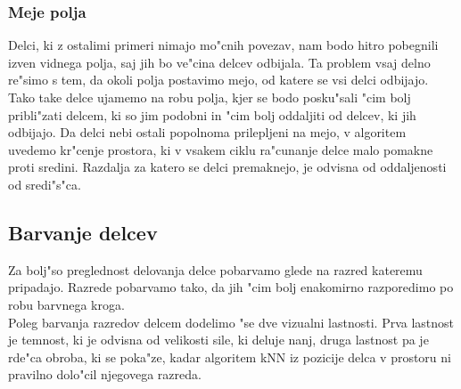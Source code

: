 \documentclass[a4paper]{article}
\begin{document}
		\subsubsection{Meje polja}
			Delci, ki z ostalimi primeri nimajo mo"cnih povezav, nam bodo hitro pobegnili izven vidnega polja, saj jih bo ve"cina delcev odbijala. Ta problem vsaj delno re"simo s tem, da okoli polja postavimo mejo, od katere se vsi delci odbijajo. Tako take delce ujamemo na robu polja, kjer se bodo posku"sali "cim bolj pribli"zati delcem, ki so jim podobni in "cim bolj oddaljiti od delcev, ki jih odbijajo. Da delci nebi ostali popolnoma prilepljeni na mejo, v algoritem uvedemo kr"cenje prostora, ki v vsakem ciklu ra"cunanje delce malo pomakne proti sredini. Razdalja za katero se delci premaknejo, je odvisna od oddaljenosti od sredi"s"ca.
	
	\subsection{Barvanje delcev}
		Za bolj"so preglednost delovanja delce pobarvamo glede na razred kateremu pripadajo. Razrede pobarvamo tako, da jih "cim bolj enakomirno razporedimo po robu barvnega kroga. \\
		Poleg barvanja razredov delcem dodelimo "se dve vizualni lastnosti. Prva lastnost je temnost, ki je odvisna od velikosti sile, ki deluje nanj, druga lastnost pa je rde"ca obroba, ki se poka"ze, kadar algoritem kNN iz pozicije delca v prostoru ni pravilno dolo"cil njegovega razreda.
\end{document}
